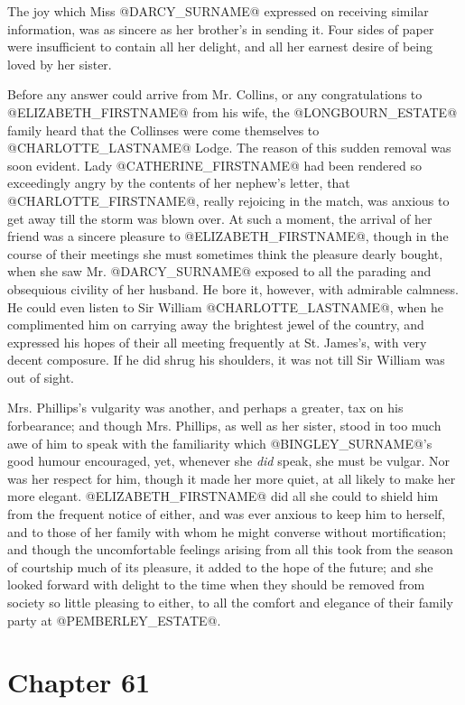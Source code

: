 The joy which Miss @DARCY_SURNAME@ expressed on receiving similar information,
was as sincere as her brother's in sending it. Four sides of paper were
insufficient to contain all her delight, and all her earnest desire of
being loved by her sister.

Before any answer could arrive from Mr. Collins, or any congratulations
to @ELIZABETH_FIRSTNAME@ from his wife, the @LONGBOURN_ESTATE@ family heard that the
Collinses were come themselves to @CHARLOTTE_LASTNAME@ Lodge. The reason of this
sudden removal was soon evident. Lady @CATHERINE_FIRSTNAME@ had been rendered
so exceedingly angry by the contents of her nephew's letter, that
@CHARLOTTE_FIRSTNAME@, really rejoicing in the match, was anxious to get away till
the storm was blown over. At such a moment, the arrival of her friend
was a sincere pleasure to @ELIZABETH_FIRSTNAME@, though in the course of their
meetings she must sometimes think the pleasure dearly bought, when she
saw Mr. @DARCY_SURNAME@ exposed to all the parading and obsequious civility of
her husband. He bore it, however, with admirable calmness. He could even
listen to Sir William @CHARLOTTE_LASTNAME@, when he complimented him on carrying away
the brightest jewel of the country, and expressed his hopes of their all
meeting frequently at St. James's, with very decent composure. If he did
shrug his shoulders, it was not till Sir William was out of sight.

Mrs. Phillips's vulgarity was another, and perhaps a greater, tax on his
forbearance; and though Mrs. Phillips, as well as her sister, stood in
too much awe of him to speak with the familiarity which @BINGLEY_SURNAME@'s good
humour encouraged, yet, whenever she \textit{did} speak, she must be vulgar.
Nor was her respect for him, though it made her more quiet, at all
likely to make her more elegant. @ELIZABETH_FIRSTNAME@ did all she could to shield
him from the frequent notice of either, and was ever anxious to keep
him to herself, and to those of her family with whom he might converse
without mortification; and though the uncomfortable feelings arising
from all this took from the season of courtship much of its pleasure, it
added to the hope of the future; and she looked forward with delight to
the time when they should be removed from society so little pleasing
to either, to all the comfort and elegance of their family party at
@PEMBERLEY_ESTATE@.



\chapter*{Chapter 61}


